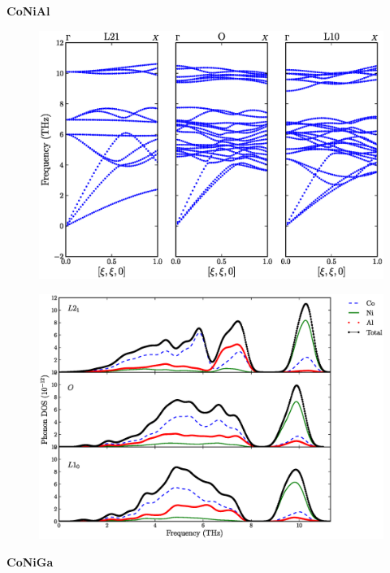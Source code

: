 \documentclass{article}
\begin{document}
\centerline{\textbf{CoNiAl}}
\begin{figure}[htp!]%
\centerline{       \includegraphics[scale=0.8]{CNA_phonon_dispersion}}
     \end{figure}
\begin{figure}[htp!]%
\centerline{       \includegraphics[scale=0.6]{CNA_pvdos_all}}
     \end{figure}
\newpage
\centerline{\textbf{CoNiGa}}
\end{document}
